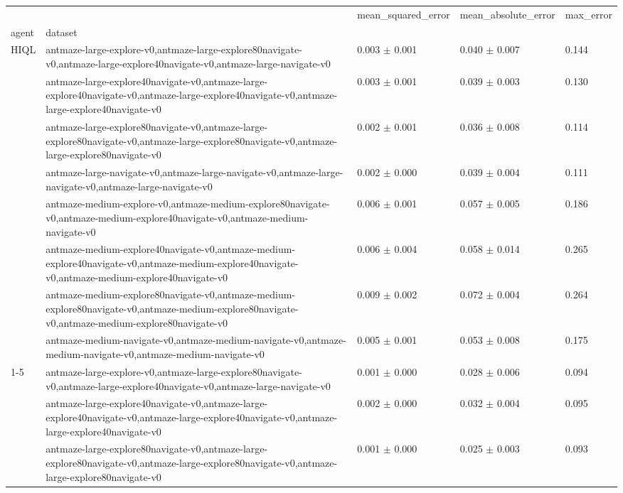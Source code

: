 \begin{tabular}{lllll}
\toprule
 &  & mean_squared_error & mean_absolute_error & max_error \\
agent & dataset &  &  &  \\
\midrule
\multirow[t]{8}{*}{HIQL} & antmaze-large-explore-v0,antmaze-large-explore80navigate-v0,antmaze-large-explore40navigate-v0,antmaze-large-navigate-v0 & 0.003 $\pm$ 0.001 & 0.040 $\pm$ 0.007 & 0.144 \\
 & antmaze-large-explore40navigate-v0,antmaze-large-explore40navigate-v0,antmaze-large-explore40navigate-v0,antmaze-large-explore40navigate-v0 & 0.003 $\pm$ 0.001 & 0.039 $\pm$ 0.003 & 0.130 \\
 & antmaze-large-explore80navigate-v0,antmaze-large-explore80navigate-v0,antmaze-large-explore80navigate-v0,antmaze-large-explore80navigate-v0 & 0.002 $\pm$ 0.001 & 0.036 $\pm$ 0.008 & 0.114 \\
 & antmaze-large-navigate-v0,antmaze-large-navigate-v0,antmaze-large-navigate-v0,antmaze-large-navigate-v0 & 0.002 $\pm$ 0.000 & 0.039 $\pm$ 0.004 & 0.111 \\
 & antmaze-medium-explore-v0,antmaze-medium-explore80navigate-v0,antmaze-medium-explore40navigate-v0,antmaze-medium-navigate-v0 & 0.006 $\pm$ 0.001 & 0.057 $\pm$ 0.005 & 0.186 \\
 & antmaze-medium-explore40navigate-v0,antmaze-medium-explore40navigate-v0,antmaze-medium-explore40navigate-v0,antmaze-medium-explore40navigate-v0 & 0.006 $\pm$ 0.004 & 0.058 $\pm$ 0.014 & 0.265 \\
 & antmaze-medium-explore80navigate-v0,antmaze-medium-explore80navigate-v0,antmaze-medium-explore80navigate-v0,antmaze-medium-explore80navigate-v0 & 0.009 $\pm$ 0.002 & 0.072 $\pm$ 0.004 & 0.264 \\
 & antmaze-medium-navigate-v0,antmaze-medium-navigate-v0,antmaze-medium-navigate-v0,antmaze-medium-navigate-v0 & 0.005 $\pm$ 0.001 & 0.053 $\pm$ 0.008 & 0.175 \\
\cline{1-5}
\multirow[t]{8}{*}{QRL} & antmaze-large-explore-v0,antmaze-large-explore80navigate-v0,antmaze-large-explore40navigate-v0,antmaze-large-navigate-v0 & 0.001 $\pm$ 0.000 & 0.028 $\pm$ 0.006 & 0.094 \\
 & antmaze-large-explore40navigate-v0,antmaze-large-explore40navigate-v0,antmaze-large-explore40navigate-v0,antmaze-large-explore40navigate-v0 & 0.002 $\pm$ 0.000 & 0.032 $\pm$ 0.004 & 0.095 \\
 & antmaze-large-explore80navigate-v0,antmaze-large-explore80navigate-v0,antmaze-large-explore80navigate-v0,antmaze-large-explore80navigate-v0 & 0.001 $\pm$ 0.000 & 0.025 $\pm$ 0.003 & 0.093 \\

\end{tabular}
